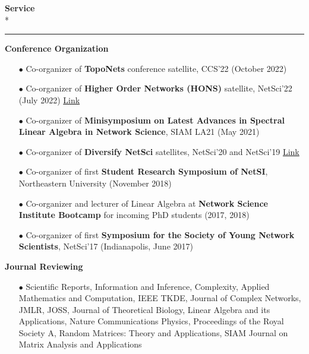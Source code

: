 \documentclass[11pt,a4paper]{article}
\newlength{\spacexs}    \setlength{\spacexs}{6pt}      %
\newlength{\spacesm}    \setlength{\spacesm}{11pt}     %
\newlength{\spacemd}    \setlength{\spacemd}{19pt}     %
\newlength{\spacexl}    \setlength{\spacexl}{38pt}     %
\newcommand{\bodytext}[1]{%
    {\fontsize{10pt}{14pt}\selectfont\color{charcoal} #1}%
}
\newcommand{\microtext}[1]{%
    {\fontsize{8pt}{11pt}\selectfont\color{mediumgray} #1}%
}
\newcommand{\sectiontitle}[1]{%
    \needspace{4\baselineskip}%
    \vspace{\spacexl}%
    {\fontsize{12pt}{14pt}\selectfont\color{navy}\bfseries #1}\\*%
    \vspace{1pt}%
    {\color{plum}\rule{20pt}{1pt}}%
    \vspace{0pt}%
}
\newcommand{\plumbullet}{{\color{plum}$\bullet$}\space}
\newcommand{\techtag}[1]{%
    {\fontspec{JetBrains Mono}\color{plum}\microtext{#1}}
}
\begin{document}
\sectiontitle{Service}
\vspace{\spacesm}

\bodytext{\textbf{Conference Organization}}

\vspace{\spacexs}
\begin{itemize}[leftmargin=15pt,itemindent=0pt,labelwidth=10pt,labelsep=5pt,itemsep=1pt,parsep=0pt,topsep=0pt,partopsep=0pt]
    \item[\plumbullet] \bodytext{Co-organizer of \textbf{TopoNets} conference satellite, CCS'22 (October 2022)}
    \item[\plumbullet] \bodytext{Co-organizer of \textbf{Higher Order Networks (HONS)} satellite, NetSci'22 (July 2022) \href{https://hons-web.github.io/online/}{\techtag{Link}}}
    \item[\plumbullet] \bodytext{Co-organizer of \textbf{Minisymposium on Latest Advances in Spectral Linear Algebra in Network Science}, SIAM LA21 (May 2021)}
    \item[\plumbullet] \bodytext{Co-organizer of \textbf{Diversify NetSci} satellites, NetSci'20 and NetSci'19 \href{https://www.networkscienceinstitute.org/diversifynetsci2020}{\techtag{Link}}}
    \item[\plumbullet] \bodytext{Co-organizer of first \textbf{Student Research Symposium of NetSI}, Northeastern University (November 2018)}
    \item[\plumbullet] \bodytext{Co-organizer and lecturer of Linear Algebra at \textbf{Network Science Institute Bootcamp} for incoming PhD students (2017, 2018)}
    \item[\plumbullet] \bodytext{Co-organizer of first \textbf{Symposium for the Society of Young Network Scientists}, NetSci'17 (Indianapolis, June 2017)}
\end{itemize}

\vspace{\spacemd}

\bodytext{\textbf{Journal Reviewing}}

\vspace{\spacexs}
\begin{itemize}[leftmargin=15pt,itemindent=0pt,labelwidth=10pt,labelsep=5pt,itemsep=1pt,parsep=0pt,topsep=0pt,partopsep=0pt]
    \item[\plumbullet] \bodytext{Scientific Reports, Information and Inference, Complexity, Applied Mathematics and Computation, IEEE TKDE, Journal of Complex Networks, JMLR, JOSS, Journal of Theoretical Biology, Linear Algebra and its Applications, Nature Communications Physics, Proceedings of the Royal Society A, Random Matrices: Theory and Applications, SIAM Journal on Matrix Analysis and Applications}
\end{itemize}
\end{document}
